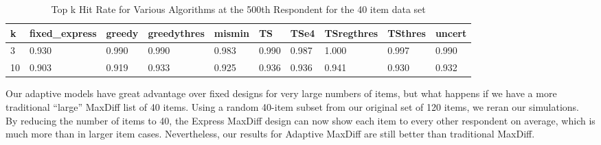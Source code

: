 \documentclass[nonblindrev]{informs3}
\begin{document}
\begin{table}
\begin{center}
\begin{tabular}{llllllllll}
\hline   k &  fixed\_express &  greedy &  greedythres &  mismin &    TS &  TSe4 &  TSregthres &  TSthres &  uncert \\\hline    3 &          0.930 &   0.990 &        0.990 &   0.983 & 0.990 & 0.987 &       1.000 &    0.997 &   0.990 \\  10 &          0.903 &   0.919 &        0.933 &   0.925 & 0.936 & 0.936 &       0.941 &    0.930 &   0.932 \end{tabular}
\end{center}
\caption{Top k Hit Rate for Various Algorithms at the 500th Respondent for the 40 item data set}
\label{table:40at500}
\end{table}
Our adaptive models have great advantage over fixed designs for very large numbers of items, but what happens if we have a more traditional ``large'' MaxDiff list of 40 items. Using a random 40-item subset from our original set of 120 items, we reran our simulations. \\
By reducing the number of items to 40, the Express MaxDiff design can now show each item to every other respondent on average, which is much more than in larger item cases.
Nevertheless, our results for Adaptive MaxDiff are still better than traditional MaxDiff.
\end{document}
